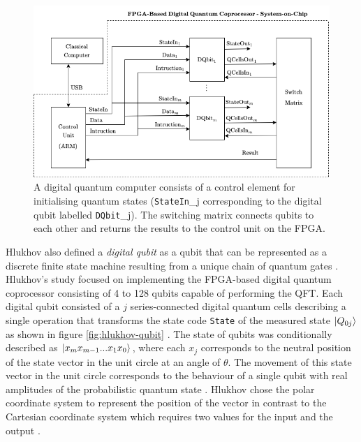 \begin{figure}[!ht]
	\centering
	\includegraphics[width=1.0\linewidth]{body/ch3/figs/hlukhov-digital-qc}
	\caption[Generalised Functional Diagram of an Emulated Digital Quantum Computer by Hlukhov.]{A digital quantum computer consists of a control element for initialising quantum states (\texttt{StateIn}\_j corresponding to the digital qubit labelled \texttt{DQbit}\_j). The switching matrix connects qubits to each other and returns the results to the control unit on the FPGA.}
	\label{fig:hlukhov-digital-qc}
\end{figure}

Hlukhov also defined a \textit{digital qubit} as a qubit that can be represented as a discrete finite state machine resulting from a unique chain of quantum gates \cite{Hlukhov2021}. Hlukhov's study focused on implementing the FPGA-based digital quantum coprocessor consisting of 4 to 128 qubits capable of performing the QFT. Each digital qubit consisted of a $j$ series-connected digital quantum cells describing a single operation that transforms the state code \texttt{State} of the measured state $\ket{Q_{0j}}$ as shown in figure \ref{fig:hlukhov-qubit} \cite{Hlukhov2021}. The state of qubits was conditionally described as $\ket{x_mx_{m-1}...x_1x_0}$, where each $x_j$ corresponds to the neutral position of the state vector in the unit circle at an angle of $\theta$. The movement of this state vector in the unit circle corresponds to the behaviour of a single qubit with real amplitudes of the probabilistic quantum state \cite{Hlukhov2021}. Hlukhov chose the polar coordinate system to represent the position of the vector in contrast to the Cartesian coordinate system which requires two values for the input and the output \cite{Hlukhov2021}. 

